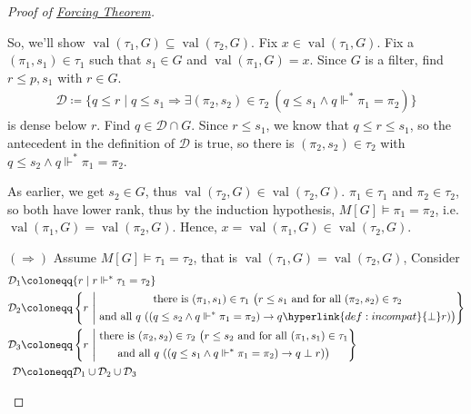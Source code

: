 \documentclass{article}
\newcommand{\1}{\mathbbm{1}}
\DeclareMathOperator{\val}{val}
\let\models\vDash
\let\forces\Vdash
\begin{document}
\begin{proof}[Proof of \hyperlink{thm:forcing}{Forcing Theorem}]
\begin{enumerate}
      So, we'll show $\val(\tau_1,G) \subseteq \val(\tau_2,G)$.
      Fix $x \in \val(\tau_1,G)$.
      Fix a $(\pi_1,s_1) \in \tau_1$ such that $s_1 \in G$ and $\val(\pi_1,G) = x$.
      Since $G$ is a filter, find $r \leq p,s_1$ with $r \in G$.
      \begin{align*}
        \mathcal{D} \coloneqq \{ q \leq r \mid q \leq s_1 \Rightarrow \exists(\pi_2, s_2) \in \tau_2 \ (q \leq s_1 \land q \forces^* \pi_1=\pi_2)\}
      \end{align*}
      is dense below $r$.
      Find $q \in \mathcal{D} \cap G$. Since $r \leq s_1$, we know that $q \leq r \leq s_1$, so the antecedent in the definition of $\mathcal{D}$ is true, so there is $(\pi_2,s_2) \in \tau_2$ with $q \leq s_2 \land q \forces^* \pi_1 = \pi_2$.

      As earlier, we get $s_2 \in G$, thus $\val(\tau_2,G) \in \val(\tau_2,G)$. $\pi_1 \in \tau_1$ and $\pi_2 \in \tau_2$, so both have lower rank, thus by the induction hypothesis, $M[G] \models \pi_1 = \pi_2$, i.e.\ $\val(\pi_1,G) = \val(\pi_2,G)$.
      Hence, $x=\val(\pi_1,G) \in \val(\tau_2,G)$.

      $(\Rightarrow)$ Assume $M[G] \models \tau_1 = \tau_2$, that is $\val(\tau_1,G) = \val(\tau_2,G)$,
      Consider
      \begin{align*}
        \mathcal{D}_1 &\coloneqq \{r \mid r \forces^* \tau_1 = \tau_2\}\\
        \mathcal{D}_2 &\coloneqq \left\{r\ \middle\vert\
          \begin{gathered}
            \text{there is } (\pi_1,s_1) \in \tau_1 \ \big(r \leq s_1 \text{ and for all }(\pi_2,s_2) \in \tau_2\\ \text{and all } q \ ((q \leq s_2 \land q \forces^* \pi_1 = \pi_2) \rightarrow q \hyperlink{def:incompat}{\perp} r)\big)
          \end{gathered}
        \right\}\\
          \mathcal{D}_3 &\coloneqq \left\{r\ \middle\vert\
            \begin{gathered}
              \text{there is } (\pi_2,s_2) \in \tau_2 \ \big(r \leq s_2 \text{ and for all }(\pi_1,s_1) \in \tau_1\\ \text{and all } q \ ((q \leq s_1 \land q \forces^* \pi_1 = \pi_2) \rightarrow q \perp r)\big)
            \end{gathered}
          \right\}\\
            \mathcal{D} &\coloneqq \mathcal{D}_1 \cup \mathcal{D}_2 \cup \mathcal{D}_3
          \end{align*}


\end{enumerate}
\end{proof}
\end{document}
